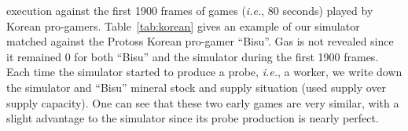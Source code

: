 \documentclass[journal]{IEEEtran}
\newcommand{\ghost}{\textsc{GHOST}\xspace}
\newcommand{\ie}{\textit{i.e.}}
\begin{document}
execution  against the  first  1900 frames of  games (\ie, 80 seconds) played by  Korean
pro-gamers. Table~\ref{tab:korean}  gives an  example of  our simulator
matched against the Protoss Korean pro-gamer ``Bisu''. Gas
is not revealed since it remained 0 for both ``Bisu'' and the simulator
during the first 1900 frames. Each time the simulator started to produce
a probe, \ie,  a worker, we write down the  simulator and ``Bisu'' mineral
stock and supply situation (used supply over supply capacity). One can
see  that  these two  early  games  are  very  similar, with  a  slight
advantage  to  the simulator  since  its  probe production  is  nearly
perfect.
\end{document}
